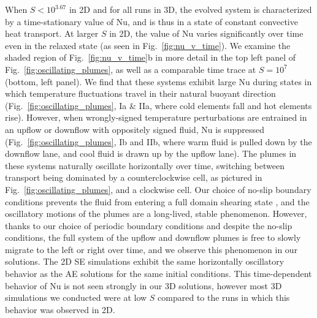 \documentclass[aps, pre, onecolumn, nofootinbib, notitlepage, groupedaddress, amsfonts, amssymb, amsmath, longbibliography]{revtex4-1}
\begin{document}
When $S < 10^{3.67}$ in 2D and for all runs in 3D, 
the evolved system is characterized by a time-stationary value of Nu, and is thus
in a state of constant convective heat transport.
At larger $S$ in 2D, the value of Nu varies significantly over time even in the
relaxed state (as seen in Fig.~\ref{fig:nu_v_time}). We examine the shaded
region of Fig.~\ref{fig:nu_v_time}b in more detail in the top left
panel of Fig.~\ref{fig:oscillating_plumes}, as well as a comparable time trace
at $S = 10^7$ (bottom, left panel). We find that these systems exhibit
large Nu during
states in which temperature fluctuations travel in their natural buoyant
direction (Fig.~\ref{fig:oscillating_plumes}, Ia \& IIa, where cold elements fall and hot elements rise).
However, when wrongly-signed temperature perturbations are entrained in an upflow or downflow
with oppositely signed fluid, Nu is suppressed (Fig.~\ref{fig:oscillating_plumes}, Ib and IIb, 
where warm fluid is pulled down by the downflow
lane, and cool fluid is drawn up by the upflow lane).
The plumes in these
systems naturally oscillate horizontally over time, switching between transport being dominated
by a counterclockwise cell, as pictured in Fig.~\ref{fig:oscillating_plumes}, and
a clockwise cell. Our choice of no-slip
boundary conditions prevents the fluid from entering a full domain shearing state 
\cite{goluskin&all2014}, and the
oscillatory motions of the plumes are a long-lived, stable phenomenon. 
However, thanks to our choice of periodic
boundary conditions and despite the no-slip conditions, the full system of the
upflow and downflow plumes is free to slowly migrate to the left or right over time,
and we observe this phenomenon in our solutions.
The 2D SE simulations exhibit the same horizontally
oscillatory behavior as the AE solutions for the same initial conditions. 
This time-dependent behavior of Nu is not seen strongly in our 3D solutions,
however most 3D simulations we conducted were at low $S$ compared to the runs in
which this behavior was observed in 2D.
\end{document}
